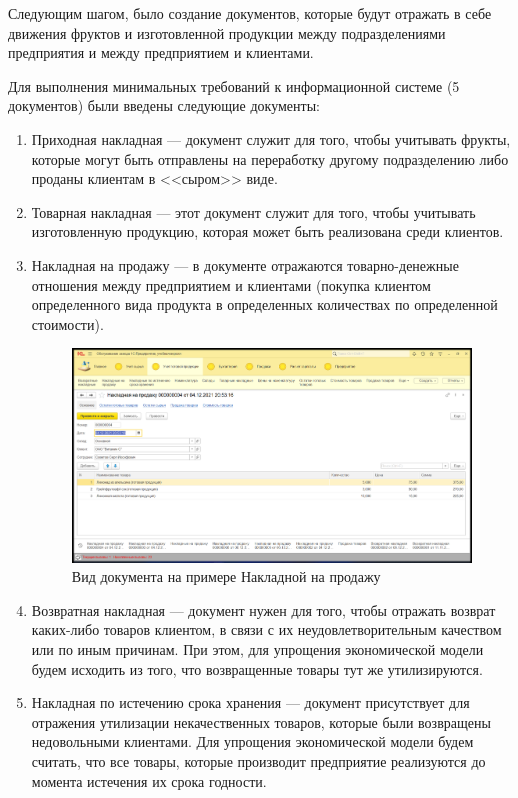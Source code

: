 \documentclass[12pt,a4paper]{article}
\begin{document}
Следующим шагом, было создание документов, которые будут отражать в себе движения фруктов и изготовленной продукции между подразделениями предприятия и между предприятием и клиентами.

Для выполнения минимальных требований к информационной системе (5 документов) были введены следующие документы:

\begin{enumerate}
    \item Приходная накладная --- документ служит для того, чтобы учитывать фрукты, которые могут быть отправлены на переработку другому подразделению либо проданы клиентам в <<сыром>> виде.
    
    \item Товарная накладная --- этот документ служит для того, чтобы учитывать изготовленную продукцию, которая может быть реализована среди клиентов.
    
    \item Накладная на продажу --- в документе отражаются товарно-денежные отношения между предприятием и клиентами (покупка клиентом определенного вида продукта в определенных количествах по определенной стоимости).
    
    \begin{figure}[!ht]
        \centering
        \includegraphics[scale=0.4]{Пример документа.png}
        \caption{Вид документа на примере Накладной на продажу}
        \label{fig:document}
    \end{figure}
    
    \item Возвратная накладная --- документ нужен для того, чтобы отражать возврат каких-либо товаров клиентом, в связи с их неудовлетворительным качеством или по иным причинам. При этом, для упрощения экономической модели будем исходить из того, что возвращенные товары тут же утилизируются.
    
    \item Накладная по истечению срока хранения --- документ присутствует для отражения утилизации некачественных товаров, которые были возвращены недовольными клиентами. Для упрощения экономической модели будем считать, что все товары, которые производит предприятие реализуются до момента истечения их срока годности.
\end{enumerate}
\end{document}
